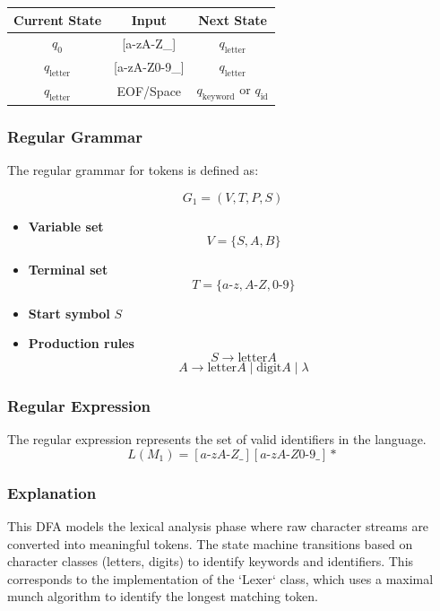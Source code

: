 \documentclass[12pt,a4paper]{article}
\begin{document}
\begin{table}[H]
\centering
\begin{tabular}{|c|c|c|}
\hline
Current State & Input & Next State \\
\hline
$q_0$ & [a-zA-Z\_] & $q_{\text{letter}}$ \\
$q_{\text{letter}}$ & [a-zA-Z0-9\_] & $q_{\text{letter}}$ \\
$q_{\text{letter}}$ & EOF/Space & $q_{\text{keyword}}$ or $q_{\text{id}}$ \\
\hline
\end{tabular}
\end{table}

\subsubsection*{Regular Grammar}

The regular grammar for tokens is defined as:

\[
G_1 = (V, T, P, S)
\]

\begin{itemize}
    \item \textbf{Variable set}
    \[
    V = \{S, A, B\}
    \]

    \item \textbf{Terminal set}
    \[
    T = \{a\text{-}z, A\text{-}Z, 0\text{-}9\}
    \]

    \item \textbf{Start symbol} $S$

    \item \textbf{Production rules}
    \[
    S \rightarrow \text{letter} A
    \]
    \[
    A \rightarrow \text{letter} A \mid \text{digit} A \mid \lambda
    \]
\end{itemize}

\subsubsection*{Regular Expression}
The regular expression represents the set of valid identifiers in the language.
\[ L(M_1) = [a\text{-}zA\text{-}Z\_][a\text{-}zA\text{-}Z0\text{-}9\_]* \]

\subsubsection*{Explanation}

This DFA models the lexical analysis phase where raw character streams are converted into meaningful tokens. The state machine transitions based on character classes (letters, digits) to identify keywords and identifiers. This corresponds to the implementation of the `Lexer` class, which uses a maximal munch algorithm to identify the longest matching token.
\end{document}
